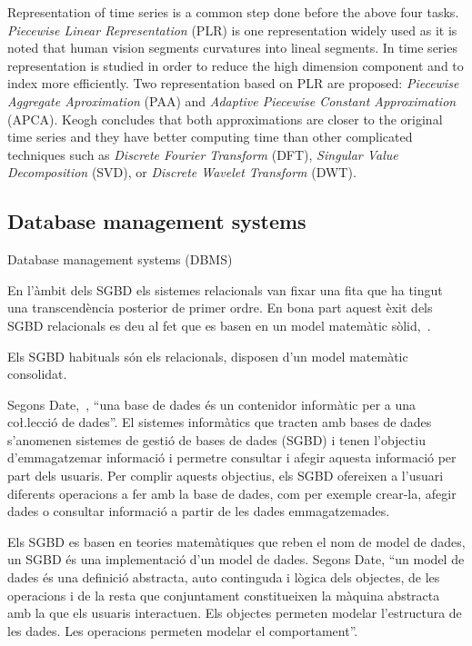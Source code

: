Representation of time series is a common step done before the above four tasks.
\emph{Piecewise Linear Representation} (PLR) \parencite{keogh97,keogh98}  is one representation widely used as it is noted that human vision segments curvatures into lineal segments. In \textcite{keogh00,keogh01} time series representation is studied in order to reduce the high dimension component and to index more efficiently. Two representation based on PLR are proposed: \emph{Piecewise Aggregate Aproximation} (PAA) and \emph{Adaptive Piecewise Constant Approximation} (APCA). Keogh concludes that both approximations are closer to the original time series and they have better computing time than other complicated techniques such as \emph{Discrete Fourier Transform} (DFT), \emph{Singular Value Decomposition} (SVD), or \emph{Discrete Wavelet Transform} (DWT).



\subsection{Database management systems}

Database management systems (DBMS)

En l'àmbit dels SGBD els sistemes relacionals van fixar una fita que ha tingut una transcendència posterior de  primer ordre. En bona part aquest èxit dels SGBD relacionals es deu al fet que es basen en un model matemàtic sòlid,~\cite{date}.

Els SGBD habituals són els relacionals,  disposen d'un model matemàtic consolidat.


Segons Date,~\cite{date}, ``una base de dades és un contenidor informàtic per a una co\l.lecció de dades''. El sistemes informàtics que tracten amb bases de dades s'anomenen sistemes de gestió de bases de dades (SGBD) i tenen l'objectiu d'emmagatzemar informació i permetre consultar i afegir aquesta informació  per part dels usuaris.
Per complir aquests objectius, els SGBD ofereixen a l'usuari diferents operacions a fer amb la base de dades, com per exemple crear-la, afegir dades o consultar informació a partir de les dades emmagatzemades.

Els SGBD es basen en teories matemàtiques que reben el nom de model de dades, un SGBD és una implementació d'un model de dades.
Segons Date, ``un model de dades és una definició abstracta, auto continguda i lògica dels objectes, de les operacions i  de la resta que conjuntament constitueixen la màquina abstracta amb la que els usuaris interactuen. Els objectes permeten modelar l'estructura de les dades. Les operacions permeten modelar el comportament''.

